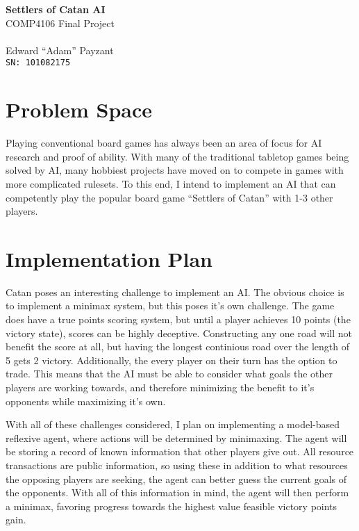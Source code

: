 \documentclass[]{article}
\begin{document}
    \begin{center}
        {\huge \textbf{Settlers of Catan AI}} \\
        {\large COMP4106 Final Project \\~\\

        Edward ``Adam'' Payzant \\
        \texttt{SN: 101082175}}
    \end{center}

    \section{Problem Space}

    Playing conventional board games has always been an area of focus for AI research and proof of ability.
    With many of the traditional tabletop games being solved by AI, many hobbiest projects have moved on to compete in games with more complicated rulesets.
    To this end, I intend to implement an AI that can competently play the popular board game ``Settlers of Catan'' with 1-3 other players.

    \section{Implementation Plan}

    Catan poses an interesting challenge to implement an AI. 
    The obvious choice is to implement a minimax system, but this poses it's own challenge.
    The game does have a true points scoring system, but until a player achieves 10 points (the victory state), scores can be highly deceptive.
    Constructing any one road will not benefit the score at all, but having the longest continious road over the length of 5 gets 2 victory.
    Additionally, the every player on their turn has the option to trade.
    This means that the AI must be able to consider what goals the other players are working towards, and therefore minimizing the benefit to it's opponents while maximizing it's own.

    With all of these challenges considered, I plan on implementing a model-based reflexive agent, where actions will be determined by minimaxing.
    The agent will be storing a record of known information that other players give out.
    All resource transactions are public information, so using these in addition to what resources the opposing players are seeking, the agent can better guess the current goals of the opponents.
    With all of this information in mind, the agent will then perform a minimax, favoring progress towards the highest value feasible victory points gain.
    
\end{document}
